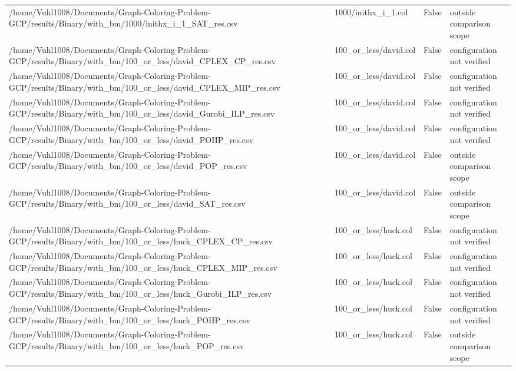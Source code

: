 \begin{table}[htbp]
\begin{tabular}{llll}
/home/Vuhl1008/Documents/Graph-Coloring-Problem-GCP/results/Binary/with\_bm/1000/inithx\_i\_1\_SAT\_res.csv & 1000/inithx\_i\_1.col & False & outside comparison scope \\
/home/Vuhl1008/Documents/Graph-Coloring-Problem-GCP/results/Binary/with\_bm/100\_or\_less/david\_CPLEX\_CP\_res.csv & 100\_or\_less/david.col & False & configuration not verified \\
/home/Vuhl1008/Documents/Graph-Coloring-Problem-GCP/results/Binary/with\_bm/100\_or\_less/david\_CPLEX\_MIP\_res.csv & 100\_or\_less/david.col & False & configuration not verified \\
/home/Vuhl1008/Documents/Graph-Coloring-Problem-GCP/results/Binary/with\_bm/100\_or\_less/david\_Gurobi\_ILP\_res.csv & 100\_or\_less/david.col & False & configuration not verified \\
/home/Vuhl1008/Documents/Graph-Coloring-Problem-GCP/results/Binary/with\_bm/100\_or\_less/david\_POHP\_res.csv & 100\_or\_less/david.col & False & configuration not verified \\
/home/Vuhl1008/Documents/Graph-Coloring-Problem-GCP/results/Binary/with\_bm/100\_or\_less/david\_POP\_res.csv & 100\_or\_less/david.col & False & outside comparison scope \\
/home/Vuhl1008/Documents/Graph-Coloring-Problem-GCP/results/Binary/with\_bm/100\_or\_less/david\_SAT\_res.csv & 100\_or\_less/david.col & False & outside comparison scope \\
/home/Vuhl1008/Documents/Graph-Coloring-Problem-GCP/results/Binary/with\_bm/100\_or\_less/huck\_CPLEX\_CP\_res.csv & 100\_or\_less/huck.col & False & configuration not verified \\
/home/Vuhl1008/Documents/Graph-Coloring-Problem-GCP/results/Binary/with\_bm/100\_or\_less/huck\_CPLEX\_MIP\_res.csv & 100\_or\_less/huck.col & False & configuration not verified \\
/home/Vuhl1008/Documents/Graph-Coloring-Problem-GCP/results/Binary/with\_bm/100\_or\_less/huck\_Gurobi\_ILP\_res.csv & 100\_or\_less/huck.col & False & configuration not verified \\
/home/Vuhl1008/Documents/Graph-Coloring-Problem-GCP/results/Binary/with\_bm/100\_or\_less/huck\_POHP\_res.csv & 100\_or\_less/huck.col & False & configuration not verified \\
/home/Vuhl1008/Documents/Graph-Coloring-Problem-GCP/results/Binary/with\_bm/100\_or\_less/huck\_POP\_res.csv & 100\_or\_less/huck.col & False & outside comparison scope \\

\end{tabular}
\end{table}
